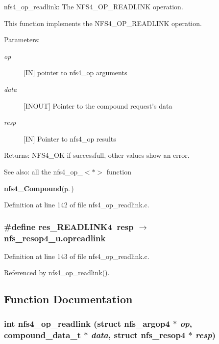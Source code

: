 nfs4\_\-op\_\-readlink: The NFS4\_\-OP\_\-READLINK operation.

This function implements the NFS4\_\-OP\_\-READLINK operation.

\begin{Desc}
\item[Parameters:]
\begin{description}
\item[{\em op}][IN] pointer to nfs4\_\-op arguments \item[{\em data}][INOUT] Pointer to the compound request's data \item[{\em resp}][IN] Pointer to nfs4\_\-op results\end{description}
\end{Desc}
\begin{Desc}
\item[Returns:]NFS4\_\-OK if successfull, other values show an error.\end{Desc}
\begin{Desc}
\item[See also:]all the nfs4\_\-op\_\-$<$$\ast$$>$ function 

{\bf nfs4\_\-Compound}{\rm (p.\,\pageref{nfs4__Compound_8c_a4})} \end{Desc}


Definition at line 142 of file nfs4\_\-op\_\-readlink.c.
\subsubsection{\setlength{\rightskip}{0pt plus 5cm}\#define res\_\-READLINK4\ resp $\rightarrow$ nfs\_\-resop4\_\-u.opreadlink}\label{nfs4__op__readlink_8c_a1}




Definition at line 143 of file nfs4\_\-op\_\-readlink.c.

Referenced by nfs4\_\-op\_\-readlink().

\subsection{Function Documentation}
\subsubsection{\setlength{\rightskip}{0pt plus 5cm}int nfs4\_\-op\_\-readlink (struct nfs\_\-argop4 $\ast$ {\em op}, compound\_\-data\_\-t $\ast$ {\em data}, struct nfs\_\-resop4 $\ast$ {\em resp})}\label{nfs4__op__readlink_8c_a2}




